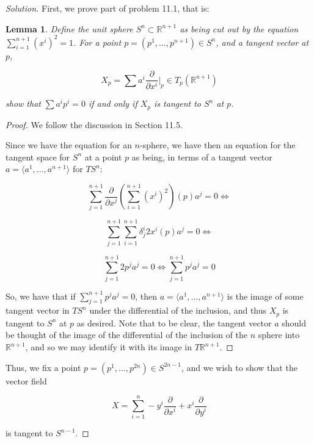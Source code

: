 \documentclass[10pt]{article}
\newtheorem{lemma}[theorem]{Lemma}
\begin{document}
\begin{proof}[Solution]

First, we prove part of problem 11.1, that is:

\begin{lemma}

Define the unit sphere $S^n \subset \mathbb{R}^{n+1}$ as being cut out by the equation $\sum_{i=1}^{n+1} (x^i)^2 = 1$. For a point $p  = (p^1,...,p^{n+1}) \in S^n$, and a tangent vector at $p$,

$$ X_p = \sum a^i \frac{\partial}{\partial x^i} \bigg|_p \in T_p(\mathbb{R}^{n+1}) $$

show that $\sum a^i p^i = 0$ if and only if $X_p$ is tangent to $S^n$ at $p$.

\end{lemma}

\begin{proof}

We follow the discussion in Section 11.5.

Since we have the equation for an $n$-sphere, we have then an equation for the tangent space for $S^n$ at a point $p$ as being, in terms of a tangent vector $a = \langle a^1,...,a^{n+1} \rangle$ for $TS^n$:

$$ \sum_{j=1}^{n+1} \frac{\partial}{\partial x^j} \left( \sum_{i=1}^{n+1} (x^i)^2  \right)(p)a^j  = 0 \iff$$

$$\sum_{j=1}^{n+1}  \sum_{i=1}^{n+1} \delta^i_j 2x^i (p) a^j  = 0  \iff$$

$$\sum_{j=1}^{n+1} 2p^j a^j = 0 \iff \sum_{j=1}^{n+1} p^j a^j = 0 $$

So, we have that if $\sum_{j=1}^{n+1} p^j a^j = 0$, then $a = \langle a^1,...,a^{n+1} \rangle$ is the image of some tangent vector in $TS^{n}$ under the differential of the inclusion, and thus $X_p$ is tangent to $S^n$ at $p$ as desired. Note that to be clear, the tangent vector $a$ should be thought of the image of the differential of the inclusion of the $n$ sphere into $\mathbb{R}^{n+1}$, and so we may identify it with its image in $T\mathbb{R}^{n+1}$.

\end{proof}


Thus, we fix a point $p = (p^1,...,p^{2n}) \in S^{2n-1}$, and we wish to show that the vector field

$$ X =  \sum_{i=1}^n -y^i \frac{\partial}{\partial x^i} + x^i \frac{\partial}{\partial y^i} $$

is tangent to $S^{n-1}$.


\end{proof}
\end{document}
